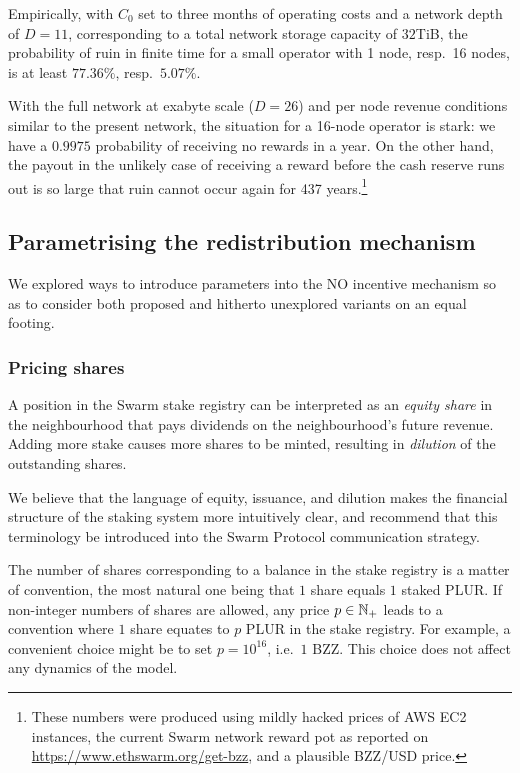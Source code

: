 Empirically, with $C_0$ set to three months of operating costs and a network depth of $D=11$, corresponding to a total network storage capacity of $32$TiB, the probability of ruin in finite time for a small operator with 1 node, resp.~16 nodes, is at least $77.36\%$, resp.~$5.07\%$.
    
With the full network at exabyte scale ($D=26$) and per node revenue conditions similar to the present network, the situation for a 16-node operator is stark: we have a $0.9975$ probability of receiving no rewards in a year.
%
On the other hand, the payout in the unlikely case of receiving a reward before the cash reserve runs out is so large that ruin cannot occur again for 437 years.\footnote{These numbers were produced using mildly hacked prices of AWS EC2 instances, the current Swarm network reward pot as reported on \url{https://www.ethswarm.org/get-bzz}, and a plausible BZZ/USD price.}

\subsection*{Parametrising the redistribution mechanism}

We explored ways to introduce parameters into the NO incentive mechanism so as to consider both proposed and hitherto unexplored variants on an equal footing.

\subsubsection*{Pricing shares}

A position in the Swarm stake registry can be interpreted as an \emph{equity share} in the neighbourhood that pays dividends on the neighbourhood's future revenue.
%
Adding more stake causes more shares to be minted, resulting in \emph{dilution} of the outstanding shares.

We believe that the language of equity, issuance, and dilution makes the financial structure of the staking system more intuitively clear, and recommend that this terminology be introduced into the Swarm Protocol communication strategy.

The number of shares corresponding to a balance in the stake registry is a matter of convention, the most natural one being that $1$ share equals $1$ staked PLUR.
%
If non-integer numbers of shares are allowed, any price $p\in\mathbb{N}_+$ leads to a convention where $1$ share equates to $p$ PLUR in the stake registry.
%
For example, a convenient choice might be to set $p=10^{16}$, i.e.~$1$ BZZ.
%
This choice does not affect any dynamics of the model.

